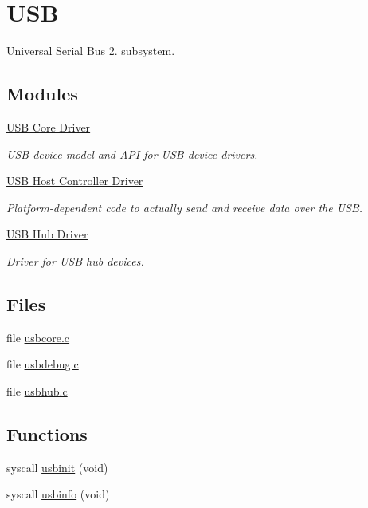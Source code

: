 \hypertarget{group__usb}{\section{U\-S\-B}
\label{group__usb}
}


Universal Serial Bus 2. subsystem.  


\subsection*{Modules}
\begin{DoxyCompactItemize}
\item 
\hyperlink{group__usbcore}{U\-S\-B Core Driver}
\begin{DoxyCompactList}\small\item\em U\-S\-B device model and A\-P\-I for U\-S\-B device drivers. \end{DoxyCompactList}\item 
\hyperlink{group__usbhcd}{U\-S\-B Host Controller Driver}
\begin{DoxyCompactList}\small\item\em Platform-\/dependent code to actually send and receive data over the U\-S\-B. \end{DoxyCompactList}\item 
\hyperlink{group__usbhub}{U\-S\-B Hub Driver}
\begin{DoxyCompactList}\small\item\em Driver for U\-S\-B hub devices. \end{DoxyCompactList}\end{DoxyCompactItemize}
\subsection*{Files}
\begin{DoxyCompactItemize}
\item 
file \hyperlink{usbcore_8c}{usbcore.\-c}
\item 
file \hyperlink{usbdebug_8c}{usbdebug.\-c}
\item 
file \hyperlink{usbhub_8c}{usbhub.\-c}
\end{DoxyCompactItemize}
\subsection*{Functions}
\begin{DoxyCompactItemize}
\item 
syscall \hyperlink{group__usb_ga44a089d3d6c6297f5880f14eeb1d6397}{usbinit} (void)
\item 
syscall \hyperlink{group__usb_ga264444ef6b00c2562ca7b0d897d34025}{usbinfo} (void)
\end{DoxyCompactItemize}


